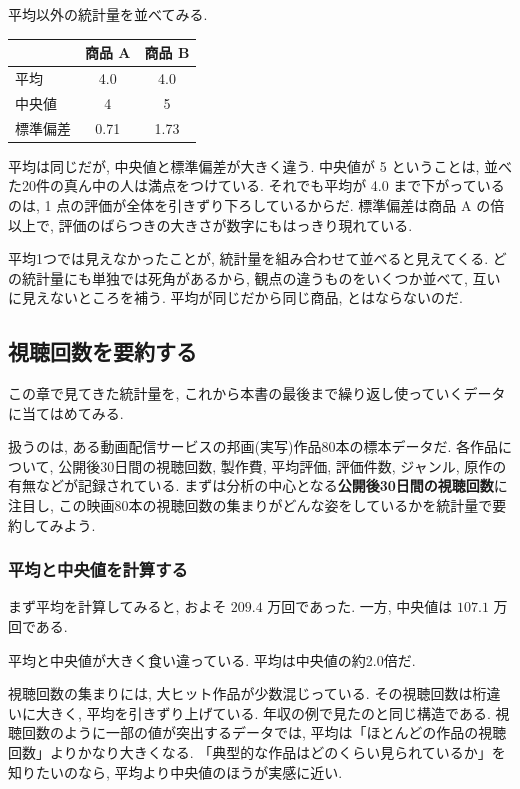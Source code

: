    平均以外の統計量を並べてみる.

    \begin{center}
      \begin{tabular}{l|cc}
        & 商品 A & 商品 B \\ \hline
        平均 & 4.0 & 4.0 \\
        中央値 & 4 & 5 \\
        標準偏差 & 0.71 & 1.73 \\
      \end{tabular}
    \end{center}

    平均は同じだが, 中央値と標準偏差が大きく違う.
    中央値が 5 ということは, 並べた20件の真ん中の人は満点をつけている.
    それでも平均が 4.0 まで下がっているのは, 1 点の評価が全体を引きずり下ろしているからだ.
    標準偏差は商品 A の倍以上で, 評価のばらつきの大きさが数字にもはっきり現れている.

    平均1つでは見えなかったことが, 統計量を組み合わせて並べると見えてくる.
    どの統計量にも単独では死角があるから, 観点の違うものをいくつか並べて, 互いに見えないところを補う.
    平均が同じだから同じ商品, とはならないのだ.

  \subsection{視聴回数を要約する}

    この章で見てきた統計量を, これから本書の最後まで繰り返し使っていくデータに当てはめてみる.

    扱うのは, ある動画配信サービスの邦画(実写)作品80本の標本データだ.
    各作品について, 公開後30日間の視聴回数, 製作費, 平均評価, 評価件数, ジャンル, 原作の有無などが記録されている.
    まずは分析の中心となる\textbf{公開後30日間の視聴回数}に注目し, この映画80本の視聴回数の集まりがどんな姿をしているかを統計量で要約してみよう.

    \subsubsection*{平均と中央値を計算する}

    まず平均を計算してみると, およそ $209.4$ 万回であった.
    一方, 中央値は $107.1$ 万回である.

    平均と中央値が大きく食い違っている.
    平均は中央値の約2.0倍だ.

    視聴回数の集まりには, 大ヒット作品が少数混じっている.
    その視聴回数は桁違いに大きく, 平均を引きずり上げている.
    年収の例で見たのと同じ構造である.
    視聴回数のように一部の値が突出するデータでは, 平均は「ほとんどの作品の視聴回数」よりかなり大きくなる.
    「典型的な作品はどのくらい見られているか」を知りたいのなら, 平均より中央値のほうが実感に近い.

